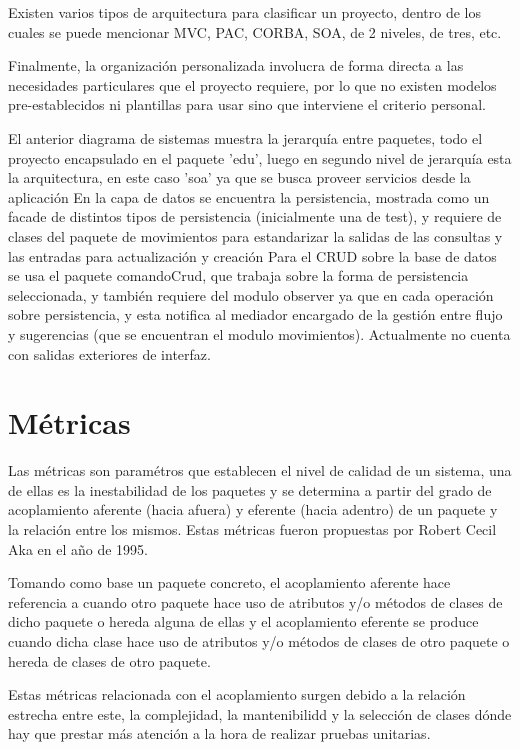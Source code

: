 Existen varios tipos de arquitectura para clasificar un proyecto, dentro de los cuales se puede mencionar MVC, PAC, CORBA, SOA, de 2 niveles, de tres, etc.

Finalmente, la organización personalizada involucra de forma directa a las necesidades particulares que el proyecto requiere, por lo que no existen modelos pre-establecidos ni plantillas para usar sino que interviene el criterio personal.

El anterior diagrama de sistemas muestra la jerarquía entre paquetes, todo el proyecto encapsulado en el paquete 'edu', luego en segundo nivel de jerarquía esta la arquitectura, en este caso 'soa' ya que se busca proveer servicios desde la aplicación En la capa de datos se encuentra la persistencia, mostrada como un facade de distintos tipos de persistencia (inicialmente una de test), y requiere de clases del paquete de movimientos para estandarizar la salidas de las consultas y las entradas para actualización y creación Para el CRUD sobre la base de datos se usa el paquete comandoCrud, que trabaja sobre la forma de persistencia seleccionada, y también requiere del modulo observer ya que en cada operación sobre persistencia, y esta notifica al mediador encargado de la gestión entre flujo y sugerencias (que se encuentran el modulo movimientos). Actualmente no cuenta con salidas exteriores de interfaz.\newpage

\section{Métricas}
Las métricas son paramétros que establecen el nivel de calidad de un sistema, una de ellas es la inestabilidad de los paquetes y se determina a partir del grado de acoplamiento aferente (hacia afuera) y eferente (hacia adentro) de un paquete y la relación entre los mismos. Estas métricas fueron propuestas por Robert Cecil Aka en el año de 1995.

Tomando como base un paquete concreto, el acoplamiento aferente hace referencia a cuando otro paquete hace uso de atributos y/o métodos de clases de dicho paquete o hereda alguna de ellas y el acoplamiento eferente se produce cuando dicha clase hace uso de atributos y/o métodos de clases de otro paquete o hereda de clases de otro paquete.

Estas métricas relacionada con el acoplamiento surgen debido a la relación estrecha entre este, la complejidad, la mantenibilidd y la selección de clases dónde hay que prestar más atención a la hora de realizar pruebas unitarias.

